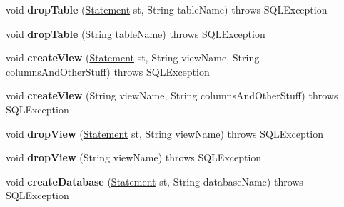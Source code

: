 \begin{DoxyCompactItemize}
\item 
\mbox{\label{classtestsuite_1_1_base_test_case_a84f311adb4febe06deab08a132f85eaf}} 
void {\bfseries drop\+Table} (\mbox{\hyperlink{interfacecom_1_1mysql_1_1jdbc_1_1_statement}{Statement}} st, String table\+Name)  throws S\+Q\+L\+Exception 
\item 
\mbox{\label{classtestsuite_1_1_base_test_case_a6c0b307be5e764c26f34b91f6d6a6467}} 
void {\bfseries drop\+Table} (String table\+Name)  throws S\+Q\+L\+Exception 
\item 
\mbox{\label{classtestsuite_1_1_base_test_case_a983df40dad5ef6b021807e9e04cc72b7}} 
void {\bfseries create\+View} (\mbox{\hyperlink{interfacecom_1_1mysql_1_1jdbc_1_1_statement}{Statement}} st, String view\+Name, String columns\+And\+Other\+Stuff)  throws S\+Q\+L\+Exception 
\item 
\mbox{\label{classtestsuite_1_1_base_test_case_a283fa00242603070d4f3b90350114b56}} 
void {\bfseries create\+View} (String view\+Name, String columns\+And\+Other\+Stuff)  throws S\+Q\+L\+Exception 
\item 
\mbox{\label{classtestsuite_1_1_base_test_case_a3b274340f82f139a17b459cd34092a63}} 
void {\bfseries drop\+View} (\mbox{\hyperlink{interfacecom_1_1mysql_1_1jdbc_1_1_statement}{Statement}} st, String view\+Name)  throws S\+Q\+L\+Exception 
\item 
\mbox{\label{classtestsuite_1_1_base_test_case_a5c3ce4b39ab6ae72b494c165fc53a7d3}} 
void {\bfseries drop\+View} (String view\+Name)  throws S\+Q\+L\+Exception 
\item 
\mbox{\label{classtestsuite_1_1_base_test_case_a19d73ebe2a92f5a1813d92d21fcd6431}} 
void {\bfseries create\+Database} (\mbox{\hyperlink{interfacecom_1_1mysql_1_1jdbc_1_1_statement}{Statement}} st, String database\+Name)  throws S\+Q\+L\+Exception 
\item 
\mbox{\label{classtestsuite_1_1_base_test_case_aea6308a3defd8463397b835996508c4e}} 

\end{DoxyCompactItemize}
